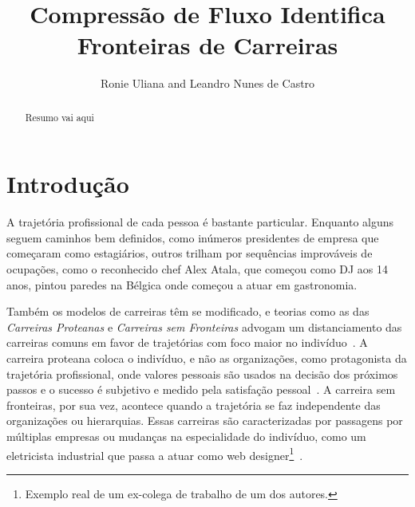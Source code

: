 \documentclass[
  article,
  11pt,
  a4paper,
  english,
  brazil,
  sumario=tradicional]{abntex2}
\title{Compressão de Fluxo Identifica Fronteiras de Carreiras}
\author{Ronie Uliana and Leandro Nunes de Castro}
\begin{document}

\frenchspacing

\maketitle

\begin{abstract}
Resumo vai aqui
\end{abstract}

\section{Introdução}

A trajetória profissional de cada pessoa é bastante particular. Enquanto alguns seguem caminhos bem definidos, como inúmeros presidentes de empresa que começaram como estagiários, outros trilham por sequências improváveis de ocupações, como o reconhecido chef Alex Atala, que começou como DJ aos 14 anos, pintou paredes na Bélgica onde começou a atuar em gastronomia.


Também os modelos de carreiras têm se modificado, e teorias como as das \textit{Carreiras Proteanas} e \textit{Carreiras sem Fronteiras} advogam um distanciamento das carreiras comuns em favor de trajetórias com foco maior no indivíduo~\cite{Bendassolli2009-bg}. A carreira proteana coloca o indivíduo, e não as organizações, como protagonista da trajetória profissional, onde valores pessoais são usados na decisão dos próximos passos e o sucesso é subjetivo e medido pela satisfação pessoal~\cite{Hall2004-ke}. A carreira sem fronteiras, por sua vez, acontece quando a trajetória se faz independente das organizações ou hierarquias. Essas carreiras são caracterizadas por passagens por múltiplas empresas ou mudanças na especialidade do indivíduo, como um eletricista industrial que passa a atuar como web designer\footnote{Exemplo real de um ex-colega de trabalho de um dos autores.}~\cite{Arthur1994-qq}.

\end{document}
